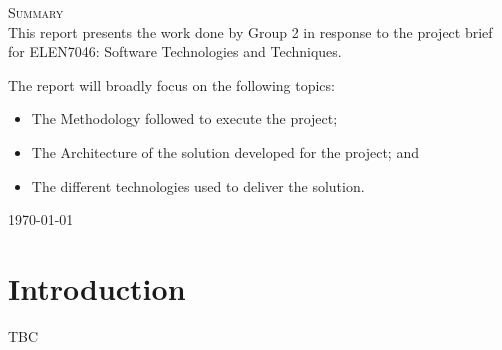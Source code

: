 \documentclass[12pt]{article} %
\begin{document}
\begin{titlepage}
		\begin{flushleft}\large
			\textsc{Summary}\\
			
			This report presents the work done by Group 2 in response to the project brief for ELEN7046: Software Technologies and Techniques.
			
			The report will broadly focus on the following topics:
			
				\begin{itemize}
					\item The Methodology followed to execute the project;
					\item The Architecture of the solution developed for the project; and
					\item The different technologies used to deliver the solution.
				\end{itemize}
		\end{flushleft}
		{\large \today}\\[3cm] %
		
		
		\vfill %
		
	\end{titlepage}
	
	
	\tableofcontents %
	
	\newpage %
	
	
	\section{Introduction} %
	
	TBC
	
		
\end{document}
